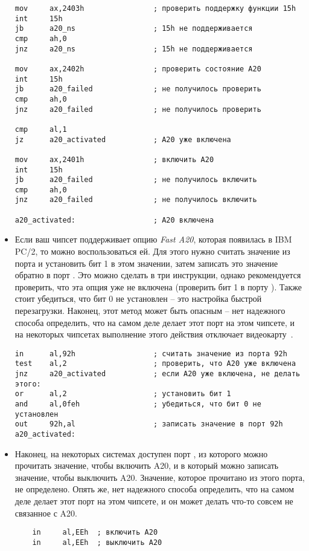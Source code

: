 \documentclass[a4page]{article}
\begin{document}
\begin{itemize}
\begin{verbatim}
mov     ax,2403h                ; проверить поддержку функции 15h
int     15h
jb      a20_ns                  ; 15h не поддерживается 
cmp     ah,0
jnz     a20_ns                  ; 15h не поддерживается

mov     ax,2402h                ; проверить состояние A20
int     15h
jb      a20_failed              ; не получилось проверить
cmp     ah,0
jnz     a20_failed              ; не получилось проверить

cmp     al,1
jz      a20_activated           ; A20 уже включена

mov     ax,2401h                ; включить A20
int     15h
jb      a20_failed              ; не получилось включить
cmp     ah,0
jnz     a20_failed              ; не получилось включить

a20_activated:                  ; A20 включена
\end{verbatim}

    \item
        Если ваш чипсет поддерживает опцию \emph{Fast A20}, которая появилась в IBM PC/2,
        то можно воспользоваться ей.
        Для этого нужно считать значение из порта  и установить бит 1 в этом значении,
        затем записать это значение обратно в порт .
        Это можно сделать в три инструкции,
        однако рекомендуется проверить, что эта опция уже не включена (проверить бит 1 в порту ).
        Также стоит убедиться, что бит 0 не установлен -- это настройка быстрой перезагрузки.
        Наконец, этот метод может быть опасным -- нет надежного способа определить, что на самом деле
        делает этот порт на этом чипсете, и на некоторых чипсетах выполнение этого действия отключает видеокарту~\cite{web:a20pain}.

\begin{verbatim}
in      al,92h                  ; считать значение из порта 92h
test    al,2                    ; проверить, что A20 уже включена
jnz     a20_activated           ; если A20 уже включена, не делать этого:
or      al,2                    ; установить бит 1
and     al,0feh                 ; убедиться, что бит 0 не установлен
out     92h,al                  ; записать значение в порт 92h
a20_activated:
\end{verbatim}

    \item
        Наконец, на некоторых системах доступен порт , из которого можно прочитать значение, чтобы включить A20,
        и в который можно записать значение, чтобы выключить A20. Значение, которое прочитано из этого порта, не определено.
        Опять же, нет надежного способа определить, что на самом деле делает этот порт на этом чипсете,
        и он может делать что-то совсем не связанное с A20. 

\begin{verbatim}
    in     al,EEh  ; включить A20
    in     al,EEh  ; выключить A20
\end{verbatim}

\end{itemize}
\end{document}
